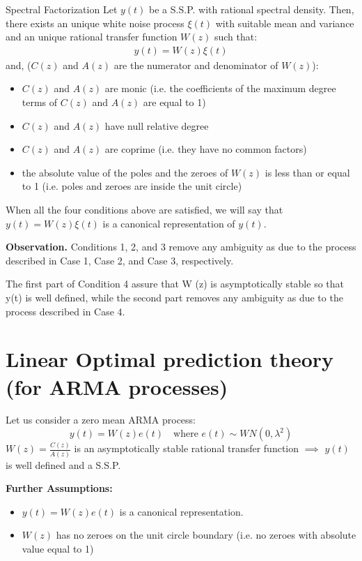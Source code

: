 
\begin{theorem}{Spectral Factorization}
	Let $y(t)$ be a S.S.P. with rational spectral density. 
	Then, there exists an unique white noise process $\xi(t)$ with suitable 
	mean and variance and an unique rational transfer function $W (z)$ such 
	that:
	\begin{align*}
		y(t) = W (z)\xi (t)
	\end{align*}
    and, ($C(z)$ and $A(z)$ are the numerator and denominator of $W (z)$):
    \begin{itemize}
   \item $C(z)$ and $A(z)$ are monic (i.e. the coefficients of the maximum 
    	degree terms of $C(z)$ and $A(z)$ are equal to 1) 
    	\item $C(z)$ and $A(z)$ have null relative degree
    	\item $C(z)$ and $A(z)$ are coprime (i.e. they have no common factors) 
    	\item the absolute value of the poles and the zeroes of $W (z)$ is less than 
    	or equal to 1 (i.e. poles and zeroes are inside the unit circle)
    \end{itemize}
\end{theorem}

When all the four conditions above are satisfied, we will say that 
$y(t) = W (z)\xi(t)$ is a canonical representation of $y(t)$.

\textbf{Observation.} Conditions 1, 2, and 3 remove any ambiguity as due to the process 
described in Case 1, Case 2, and Case 3, respectively. 

The first part of Condition 4 assure that W (z) is asymptotically stable 
so that y(t) is well defined, while the second part removes any
ambiguity as due to the process described in Case 4.


\section{Linear Optimal prediction theory (for ARMA processes) }
Let us consider a zero mean ARMA process:
$$ y(t) =W (z) e(t)  \quad \text{where }e(t)\sim W N(0,\lambda^{2} )$$
$W(z)=\frac{C(z)}{A(z)}$ is an asymptotically stable rational transfer function $\implies$ $y(t)$ is well defined and a S.S.P.

\textbf{Further Assumptions:}
\begin{itemize}
	\item $y(t) =W (z) e(t)$ is a canonical representation.
	\item $W(z)$ has no zeroes on the unit circle boundary (i.e. no 
	zeroes with absolute value equal to 1)
\end{itemize}
 
